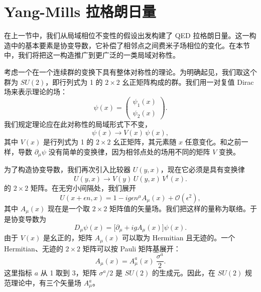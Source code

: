 \section{Yang-Mills 拉格朗日量}

在上一节中，我们从局域相位不变性的假设出发构建了 QED 拉格朗日量。这一构造中的基本要素是协变导数，它补偿了相邻点之间费米子场相位的变化。在本节中，我们将把这一构造推广到更广泛的一类局域对称性。

考虑一个在一个连续群的变换下具有整体对称性的理论。为明确起见，我们取这个群为 $SU(2)$，即行列式为 1 的 $2\times2$ 幺正矩阵构成的群。我们用一对复值 Dirac 场来表示理论的场：
\begin{equation}
  \psi(x) = \begin{pmatrix}\psi_1(x)\\ \psi_2(x)\end{pmatrix} .
\end{equation}
我们规定理论应在此对称性的局域形式下不变，
\begin{equation}
  \psi(x) \to V(x)\,\psi(x) ,
  \label{eq:15.20}
\end{equation}
其中 $V(x)$ 是行列式为 1 的 $2\times2$ 幺正矩阵，其元素随 $x$ 任意变化。和之前一样，导数 $\partial_\mu\psi$ 没有简单的变换律，因为相邻点处的场用不同的矩阵 $V$ 变换。

为了构造协变导数，我们再次引入比较器 $U(y,x)$，现在它必须是具有变换律
\begin{equation}
  U(y,x) \to V(y)\,U(y,x)\,V^{\dagger}(x) .
  \label{eq:15.22}
\end{equation}
的 $2\times2$ 矩阵。在无穷小间隔处，我们展开
\begin{equation}
  U(x+\epsilon n, x) = 1 - ig\epsilon n^\mu A_\mu(x) + \mathcal{O}(\epsilon^2),
  \label{eq:15.23}
\end{equation}
其中 $A_\mu(x)$ 现在是一个取 $2\times2$ 矩阵值的矢量场。我们把这样的量称为联络。于是协变导数为
\begin{equation}
  D_\mu\psi(x) = \bigl[ \partial_\mu + igA_\mu(x) \bigr]\psi(x) .
  \label{eq:15.24}
\end{equation}
由于 $V(x)$ 是幺正的，矩阵 $A_\mu(x)$ 可以取为 Hermitian 且无迹的。一个 Hermitian、无迹的 $2\times2$ 矩阵可以按 Pauli 矩阵基展开：
\begin{equation}
  A_\mu(x) = A_\mu^a(x)\ \frac{\sigma^a}{2} .
  \label{eq:15.25}
\end{equation}
这里指标 $a$ 从 1 取到 3，矩阵 $\sigma^a/2$ 是 $SU(2)$ 的生成元。因此，在 $SU(2)$ 规范理论中，有三个矢量场 $A_\mu^a$。

